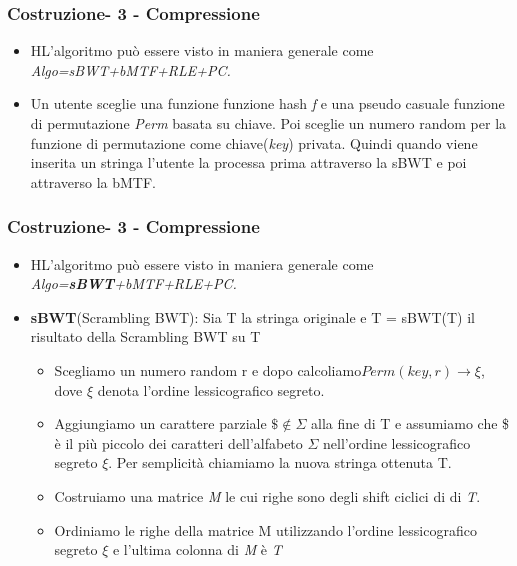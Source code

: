 \documentclass{beamer}
\begin{document}
\begin{frame}
\frametitle{Costruzione- 3 - Compressione}
\begin{itemize}
	\item HL’algoritmo può essere visto in maniera generale come \textit{Algo=sBWT+bMTF+RLE+PC.}\pause
	\item Un utente sceglie una funzione funzione hash \textit{f} e una pseudo casuale funzione di permutazione \textit{Perm} basata su chiave. Poi sceglie un numero random per la funzione di permutazione come chiave(\textit{key}) privata. Quindi quando viene inserita un stringa l’utente la processa prima attraverso la sBWT e poi attraverso la bMTF. 
\end{itemize}
\end{frame}

\begin{frame}
\frametitle{Costruzione- 3 - Compressione}
\begin{itemize}
	\item HL’algoritmo può essere visto in maniera generale come \textit{Algo=\textbf{sBWT}+bMTF+RLE+PC.}\pause
	\item \textbf{sBWT}(Scrambling BWT): Sia T la stringa originale e T = sBWT(T) il risultato della Scrambling BWT su T\pause
		\begin{itemize}
			\item Scegliamo un numero random r e dopo calcoliamo$  Perm(key,r) \rightarrow \xi $, dove $ \xi $ denota l’ordine lessicografico segreto.\pause
			\item Aggiungiamo un carattere parziale $\$ \notin \Sigma$ alla fine di T e assumiamo che \$ è il più piccolo dei caratteri dell'alfabeto $\Sigma$ nell’ordine lessicografico segreto $\xi$. Per semplicità chiamiamo la nuova stringa ottenuta T.\pause
			\item Costruiamo una matrice  \textit{M} le cui righe sono degli shift ciclici di di \textit{T}.\pause
			\item Ordiniamo le righe della matrice M utilizzando l’ordine lessicografico segreto $\xi$  e l’ultima colonna di \textit{M} è \textit{T}
		\end{itemize}
\end{itemize}
\end{frame}
\end{document}
